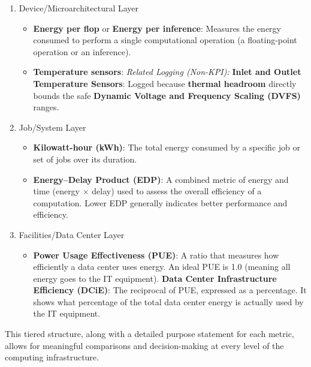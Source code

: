 \begin{itemize}

\begin{enumerate}[label=\arabic*., leftmargin=0pt, labelsep=1em, align=left]

\item Device/Microarchitectural Layer
\begin{itemize}
        \item \textbf{Energy per flop} or \textbf{Energy per inference}: Measures the energy consumed to perform a single computational operation (a floating-point operation or an inference).
        \item \textbf{Temperature sensors}: \emph{Related Logging (Non-KPI):} \textbf{Inlet and Outlet Temperature Sensors}: Logged because \textbf{thermal headroom} directly bounds the safe \textbf{Dynamic Voltage and Frequency Scaling (DVFS)} ranges.
\end{itemize}
\item Job/System Layer
\begin{itemize}

        \item \textbf{Kilowatt-hour (kWh)}: The total energy consumed by a specific job or set of jobs over its duration.
        \item \textbf{Energy--Delay Product (EDP)}: A combined metric of energy and time (energy $\times$ delay) used to assess the overall efficiency of a computation. Lower EDP generally indicates better performance and efficiency.
\end{itemize}

\item Facilities/Data Center Layer
\begin{itemize}

        \item \textbf{Power Usage Effectiveness (PUE)}: A ratio that measures how efficiently a data center uses energy. An ideal PUE is 1.0 (meaning all energy goes to the IT equipment).
        \textbf{Data Center Infrastructure Efficiency (DCiE)}: The reciprocal of PUE, expressed as a percentage. It shows what percentage of the total data center energy is actually used by the IT equipment.
\end{itemize}

\end{enumerate}
\end{itemize}

This tiered structure, along with a detailed purpose statement for each metric, allows for meaningful comparisons and decision-making at every level of the computing infrastructure.

